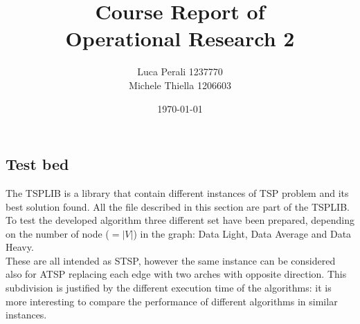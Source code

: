 \documentclass[10pt, english, openany]{report}
\title{Course Report of \\ Operational Research 2}
\author{Luca Perali 1237770 \\ Michele Thiella 1206603}
\date{\today}
\begin{document}

	
	

	\tableofcontents{}
	\clearpage

	
	
	
	
	
	
	
	
	\clearpage
	
	\begin{appendices}
		\chapter{Test bed} \label{sec:testset}
		The TSPLIB \cite{TSPLIB} is a library that contain different instances of TSP problem and its best solution found. All the file described in this section are part of the TSPLIB. To test the developed algorithm three different set have been prepared, depending on the number of node ($=|V|$) in the graph: Data Light, Data Average and Data Heavy.\\
		These are all intended as STSP, however the same instance can be considered also for ATSP replacing each edge with two arches with opposite direction. This subdivision is justified by the different execution time of the algorithms: it is more interesting to compare the performance of different algorithms in similar instances.\\
		

\end{appendices}
\end{document}
